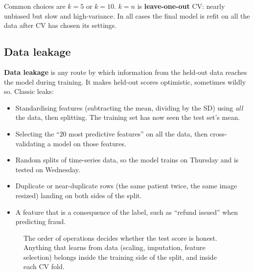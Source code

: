Common choices are $k=5$ or $k=10$. $k=n$ is \textbf{leave-one-out} CV: nearly unbiased but
slow and high-variance. In all cases the final model is refit on all the data after CV has
chosen its settings.

\subsection{Data leakage}

\textbf{Data leakage} is any route by which information from the held-out data reaches the
model during training. It makes held-out scores optimistic, sometimes wildly so. Classic
leaks:

\begin{itemize}
  \item Standardising features (subtracting the mean, dividing by the SD) using \emph{all}
  the data, then splitting. The training set has now seen the test set's mean.
  \item Selecting the ``$20$ most predictive features'' on all the data, then cross-validating
  a model on those features.
  \item Random splits of time-series data, so the model trains on Thursday and is tested on
  Wednesday.
  \item Duplicate or near-duplicate rows (the same patient twice, the same image resized)
  landing on both sides of the split.
  \item A feature that is a consequence of the label, such as ``refund issued'' when
  predicting fraud.
\end{itemize}

\begin{figure}[H]
\centering
{}
\caption{The order of operations decides whether the test score is honest. Anything that
learns from data (scaling, imputation, feature selection) belongs inside the training side of
the split, and inside each CV fold.}
\label{fig:ml-leak}
\end{figure}

